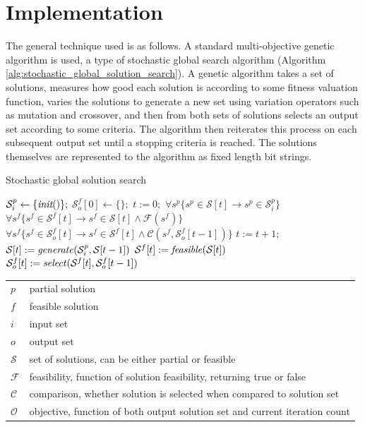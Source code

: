 \section{Implementation}
The general technique used is as follows.  A standard  multi-objective genetic algorithm is used, a type of stochastic global search algorithm (Algorithm \ref{alg:stochastic_global_solution_search}).  A genetic algorithm takes a set of solutions, measures how good each solution is according to some fitness valuation function, varies the solutions to generate a new set using variation operators such as mutation and crossover, and then from both sets of solutions selects an output set according to some criteria.  The algorithm then reiterates this process on each subsequent output set until a stopping criteria is reached.  The solutions themselves are represented to the algorithm as fixed length bit strings.  

\begin{algorithm}
  \caption{Stochastic global solution search}
  \label{alg:stochastic_global_solution_search}
  \begin{algorithmic}
    \STATE $\mathcal{S}^p_i \leftarrow \{\emph{init}()\};$
    \STATE $\mathcal{S}^f_o[0] \leftarrow \{\};$
    \STATE $t := 0;$
    \ENSURE $\forall s^p \{s^p \in \mathcal{S}[t] \rightarrow s^p \in \mathcal{S}^p_i\}$
    \ENSURE $\forall s^f \{s^f \in \mathcal{S}^f[t] \rightarrow s^f \in \mathcal{S}[t] \wedge \mathcal{F}(s^f)\}$
    \ENSURE $\forall s^f \{s^f \in \mathcal{S}^f_o[t] \rightarrow s^f \in \mathcal{S}^f[t] \wedge \mathcal{C}(s^f, \mathcal{S}^f_o[t - 1])\}$
    \STATE $t := t + 1;$
    \STATE $\mathcal{S}[t] := \mbox{\emph{generate}}(\mathcal{S}^p_i,\mathcal{S}[t-1])$
    \STATE $\mathcal{S}^f[t] := \mbox{\emph{feasible}}(\mathcal{S}[t])$
    \STATE $\mathcal{S}^f_o[t] := \mbox{\emph{select}}(\mathcal{S}^f[t], \mathcal{S}^f_o[t-1])$
    \ENDWHILE
  \end{algorithmic}
  \begin{tabular}{|l|l|}
  \hline
    $p$ & partial solution \\
    $f$ & feasible solution \\
    $i$ & input set \\
    $o$ & output set \\
    $\mathcal{S}$ & set of solutions, can be either partial or feasible \\
    $\mathcal{F}$ & feasibility, function of solution feasibility, returning true or false \\
    $\mathcal{C}$ & comparison, whether solution is selected when compared to solution set \\
    $\mathcal{O}$ & objective, function of both output solution set and current iteration count \\
  \hline
  \end{tabular}
\end{algorithm}

